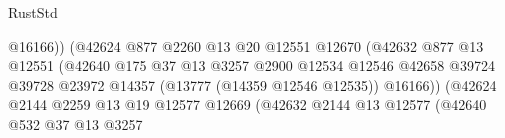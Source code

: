 \begin{lexlean}{RustStd}
\begin{coremodule}
                                                      @16166))
                                                  (@42624
                                                    @877
                                                    @2260
                                                    @13
                                                    @20
                                                    @12551
                                                    @12670
                                                    (@42632
                                                      @877
                                                      @13
                                                      @12551
                                                      (@42640
                                                        @175
                                                        @37
                                                        @13
                                                        @3257
                                                        @2900
                                                        @12534
                                                        @12546
                                                        @42658
                                                        @39724
                                                        @39728
                                                        @23972
                                                        @14357
                                                        (@13777 (@14359 @12546 @12535))
                                                        @16166))
                                                    (@42624
                                                      @2144
                                                      @2259
                                                      @13
                                                      @19
                                                      @12577
                                                      @12669
                                                      (@42632
                                                        @2144
                                                        @13
                                                        @12577
                                                        (@42640
                                                          @532
                                                          @37
                                                          @13
                                                          @3257

\end{coremodule}
\end{lexlean}
